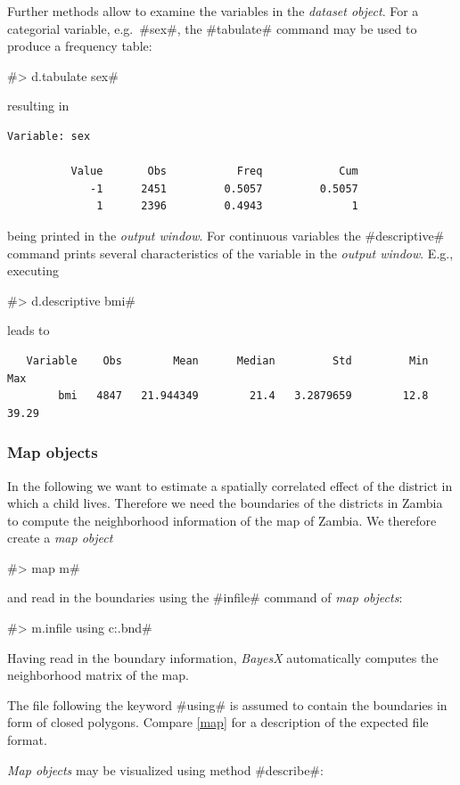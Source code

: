 Further methods allow to examine the variables in the {\it dataset
object}. For a categorial variable, e.g.~#sex#, the #tabulate#
command may be used to produce a frequency table:

#> d.tabulate sex#

resulting in

\begin{verbatim}
Variable: sex

          Value       Obs           Freq            Cum
             -1      2451         0.5057         0.5057
              1      2396         0.4943              1
\end{verbatim}

being printed in the {\it output window}. For continuous variables
the #descriptive# command prints several characteristics of the
variable in the {\em output window}. E.g., executing

#> d.descriptive bmi#

leads to

\begin{verbatim}
   Variable    Obs        Mean      Median         Std         Min         Max
        bmi   4847   21.944349        21.4   3.2879659        12.8       39.29
\end{verbatim}

\subsubsection{Map objects}\label{zambia_mcmc_maps}

In the following we want to estimate a spatially correlated effect
of the district in which a child lives. Therefore we need the
boundaries of the districts in Zambia to compute the neighborhood
information of the map of Zambia. We therefore create a {\it map
object}

#> map m#

and read in the boundaries using the #infile# command of {\it map
objects}:

#> m.infile using c:\data\zambia.bnd#

Having read in the boundary information, {\it BayesX}
automatically computes the neighborhood matrix of the map.

The file following the keyword #using# is assumed to contain the
boundaries in form of closed polygons. Compare \autoref{map} for a
description of the expected file format.

{\it Map objects} may be visualized using method #describe#:

